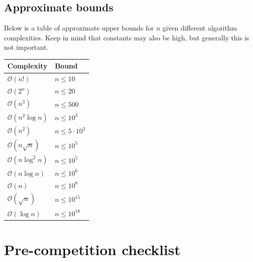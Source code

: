 


\subsection{Approximate bounds}

Below is a table of approximate upper bounds for $n$ given different algorithm complexities. Keep in mind that constants may also be high, but generally this is not important.

\begin{table}[H]
    \centering
    \begin{tabular}{ll}
        \hline
        \textbf{Complexity} \hspace{2em} & \textbf{Bound} \\
        \hline
        $\mathcal O(n!)$ & $n \leq 10$ \\
        $\mathcal O(2^n)$ & $n \leq 20$ \\
        $\mathcal O(n^3)$ & $n \leq 500$ \\
        $\mathcal O(n^2\log n)$ & $n \leq 10^3$ \\
        $\mathcal O(n^2)$ & $n \leq 5\cdot 10^3$ \\
        $\mathcal O(n\sqrt n)$ & $n \leq 10^5$ \\
        $\mathcal O(n\log^2 n)$ & $n \leq 10^5$ \\
        $\mathcal O(n\log n)$ & $n \leq 10^6$ \\
        $\mathcal O(n)$ & $n \leq 10^8$ \\
        $\mathcal O(\sqrt n)$ & $n \leq 10^{15}$ \\
        $\mathcal O(\log n)$ & $n \leq 10^{18}$ \\
        \hline
    \end{tabular}
    \label{tab:modinv}
\end{table}





\section{Pre-competition checklist}

